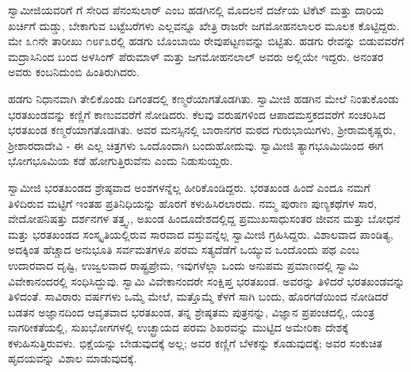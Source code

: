  ಸ್ವಾಮೀಜಿಯವರಿಗೆ  ಗೆ ಸೇರಿದ ಪೆನಂಸುಲಾರ್ ಎಂಬ ಹಡಗಿನಲ್ಲಿ ಮೊದಲನೆ ದರ್ಜೆಯ ಟಿಕೆಟ್ ಮತ್ತು ದಾರಿಯ ಖರ್ಚಿಗೆ ದುಡ್ಡು, ಬೇಕಾಗುವ ಬಟ್ಟೆಬರೆಗಳು ಎಲ್ಲವನ್ನೂ ಖೇತ್ರಿ ರಾಜರೇ ಜಗಮೋಹನಲಾಲರ ಮೂಲಕ ಕೊಟ್ಟಿದ್ದರು. ಮೇ ೩೧ನೇ ತಾರೀಖು ೧೮೯೩ರಲ್ಲಿ ಹಡಗು ಬೊಂಬಾಯಿ ರೇವುಪಟ್ಟಣವನ್ನು ಬಿಟ್ಟಿತು. ಹಡಗು ರೇವನ್ನು ಬಿಡುವವರೆಗೆ ಮದ್ರಾಸಿನಿಂದ ಬಂದ ಅಳಸಿಂಗ್ ಪೆರುಮಾಳ್ ಮತ್ತು ಜಗಮೋಹನಲಾಲ್ ಅವರು ಅಲ್ಲಿಯೇ ಇದ್ದರು. ಅನಂತರ ಅವರು ಕಂಬನಿದುಂಬಿ ಹಿಂತಿರುಗಿದರು. 

 ಹಡಗು ನಿಧಾನವಾಗಿ ತೇಲಿಕೊಂಡು ದಿಗಂತದಲ್ಲಿ ಕಣ್ಮರೆಯಾಗತೊಡಗಿತು. ಸ್ವಾಮೀಜಿ ಹಡಗಿನ ಮೇಲೆ ನಿಂತುಕೊಂಡು ಭರತಖಂಡವನ್ನು ಕಣ್ಣಿಗೆ ಕಾಣುವವರೆಗೆ ನೋಡಿದರು. ಕೆಲವು ವರುಷಗಳಿಂದ ಆಪಾದಮಸ್ತಕದವರೆಗೆ ಸಂಚರಿಸಿದ ಭರತಖಂಡ ಕಣ್ಮರೆಯಾಗತೊಡಗಿತು. ಅವರ ಮನಸ್ಸಿನಲ್ಲಿ ಬಾರಾನಗರ ಮಠದ ಗುರುಭಾಯಿಗಳು, ಶ‍್ರೀರಾಮಕೃಷ್ಣರು, ಶ‍್ರೀಶಾರದಾದೇವಿ - ಈ ಎಲ್ಲ ಚಿತ್ರಗಳು ಒಂದೊಂದಾಗಿ ಬಂದುಹೋದುವು. ಸ್ವಾಮೀಜಿ ತ್ಯಾಗಭೂಮಿಯಿಂದ ಈಗ ಭೋಗಭೂಮಿಯ ಕಡೆ ಹೋಗುತ್ತಿರುವೆನು ಎಂದು ನಿಡುಸುಯ್ದರು. 

 ಸ್ವಾಮೀಜಿ ಭರತಖಂಡದ ಶ್ರೇಷ್ಠವಾದ ಅಂಶಗಳನ್ನೆಲ್ಲ ಹೀರಿಕೊಂಡಿದ್ದರು. ಭರತಖಂಡ ಹಿಂದೆ ಎಂದೂ ನಮಗೆ ತಿಳಿದಿರುವ ಮಟ್ಟಿಗೆ ಇಂತಹ ಪ್ರತಿನಿಧಿಯನ್ನು ಹೊರಗೆ ಕಳುಹಿಸಿರಲಾರದು. ನಮ್ಮ ಪುರಾಣ ಪುಣ್ಯಕಥೆಗಳ ಸಾರ, ವೇದೋಪನಿಷತ್ತು ದರ್ಶನಗಳ ತತ್ತ್ವ,, ಅಖಂಡ ಹಿಂದೂದೇಶದಲ್ಲಿದ್ದ ಪ್ರಮುಖಸಾಧುಸಂತರ ಜೀವನ ಮತ್ತು ಬೋಧನೆ ಮತ್ತು ಭರತಖಂಡದ ಸಂಸ್ಕೃತಿಯಲ್ಲಿರುವ ಸಾರವಾದ ವಸ್ತುವನ್ನೆಲ್ಲ ಸ್ವಾಮೀಜಿ ಗ್ರಹಿಸಿದ್ದರು. ವಿಶಾಲವಾದ ಪಾಂಡಿತ್ಯ, ಅದಕ್ಕಿಂತ ಹೆಚ್ಚಾದ ಅನುಭೂತಿ ಸರ್ವಮತಗಳೂ ಪರಮ ಸತ್ಯದೆಡೆಗೆ ಒಯ್ಯುವ ಒಂದೊಂದು ಪಥ ಎಂಬ ಉದಾರವಾದ ದೃಷ್ಟಿ, ಉಜ್ವಲವಾದ ರಾಷ್ಟ್ರಪ್ರೇಮ, ಇವುಗಳೆಲ್ಲಾ ಒಂದು ಅನುಪಮ ಪ್ರಮಾಣದಲ್ಲಿ ಸ್ವಾಮಿ ವಿವೇಕಾನಂದರಲ್ಲಿ ಸಂಧಿಸಿದ್ದುವು. ಸ್ವಾಮಿ ವಿವೇಕಾನಂದರೇ ಸಂಕ್ಷಿಪ್ತ ಭರತಖಂಡ. ಅವರನ್ನು ತಿಳಿದರೆ ಭರತಖಂಡವನ್ನು ತಿಳಿದಂತೆ. ಸಾವಿರಾರು ವರ್ಷಗಳು ಒಮ್ಮೆ ಮೇಲೆ, ಮತ್ತೊಮ್ಮೆ ಕೆಳಗೆ ಸಾಗಿ ಬಂದು, ಹೊರಗಡೆಯಿಂದ ನೋಡಿದರೆ ಬಡತನ ಅಜ್ಞಾನದಿಂದ ಆವೃತವಾದ ಭರತಖಂಡ, ತನ್ನ ಶ್ರೇಷ್ಠತಮ ಪುತ್ರನನ್ನು, ವಿಜ್ಞಾನ ಪ್ರಪಂಚದಲ್ಲಿ, ಯಂತ್ರ ನಾಗರೀಕತೆಯಲ್ಲಿ, ಸುಖಭೋಗಗಳಲ್ಲಿ ಉಚ್ಛ್ರಾಯದ ಪರಮ ಶಿಖರವನ್ನು ಮುಟ್ಟಿದ ಅಮೇರಿಕಾ ದೇಶಕ್ಕೆ ಕಳುಹಿಸುತ್ತಿರುವಳು. ಭಿಕ್ಷೆಯನ್ನು ಬೇಡುವುದಕ್ಕೆ ಅಲ್ಲ; ಅವರ ಕಣ್ಣಿಗೆ ಬೆಳಕನ್ನು ಕೊಡುವುದಕ್ಕೆ; ಅವರ ಸಂಕುಚಿತ ಹೃದಯವನ್ನು ವಿಶಾಲ ಮಾಡುವುದಕ್ಕೆ. 

